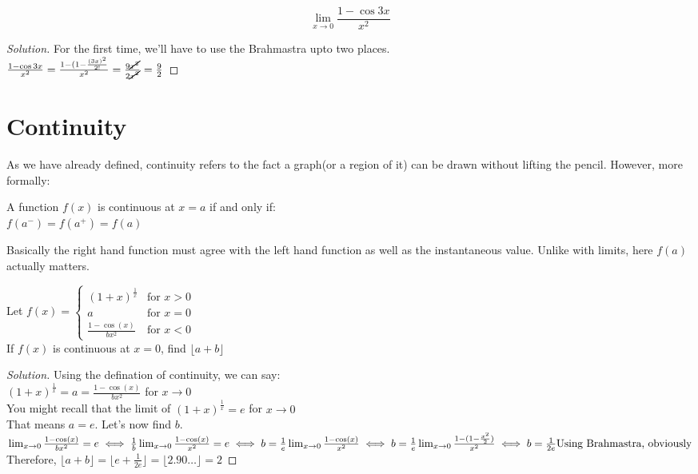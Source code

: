 \begin{example}
    \[\lim_{x \to 0}\frac{1-\cos{3x}}{x^2}\]
\end{example}
\begin{proof}
    [Solution]
    For the first time, we'll have to use the Brahmastra upto two places.\\
    $\frac{1-\cos{3x}}{x^2}\\
    =\frac{1-(1-\frac{(3x)^2}{2!}}{x^2}\\
    =\frac{9\cancel{x^2}}{2\cancel{x^2}}\\
    =\frac{9}{2}$
\end{proof}
\section{Continuity}
As we have already defined, continuity refers to the fact a graph(or a region of it) can be drawn without lifting the pencil. However, more formally:\\
\begin{definition}
    A function $f(x)$ is continuous at $x=a$ if and only if:\\
    $f(a^-)=f(a^+)=f(a)$
\end{definition}
Basically the right hand function must agree with the left hand function as well as the instantaneous value. Unlike with limits, here $f(a)$ actually matters.\\
\begin{example}
    Let $f(x)=\begin{cases}
        (1+x)^{\frac{1}{x}} & \text{for } x > 0 \\
    a & \text{for } x = 0 \\
    \frac{1-\cos(x)}{bx^2} & \text{for } x < 0
    \end{cases}$\\
    If $f(x)$ is continuous at $x=0$, find $\lfloor a+b \rfloor$
\end{example}
\begin{proof}
    [Solution]
    Using the defination of continuity, we can say:\\
    $(1+x)^{\frac{1}{x}}=a=\frac{1-\cos(x)}{bx^2}$ for $x \to 0$\\
    You might recall that the limit of $(1+x)^{\frac{1}{x}}=e$ for $x \to 0$\\
    That means $a=e$. Let's now find $b$.\\
    $\lim_{x \to 0}\frac{1-\cos(x)}{bx^2}=e\\
    \iff \frac{1}{b} \lim_{x \to 0}\frac{1-\cos(x)}{x^2}=e\\
    \iff b=\frac{1}{e} \lim_{x \to 0}\frac{1-\cos(x)}{x^2}\\
    \iff b=\frac{1}{e} \lim_{x \to 0}\frac{1-(1-\frac{x^2}{2})}{x^2}\\
    \iff b=\frac{1}{2e} \text{Using Brahmastra, obviously}$
    Therefore, $\lfloor a+b \rfloor=\lfloor e+\frac{1}{2e} \rfloor= \lfloor 2.90\dots \rfloor= 2$
\end{proof}
